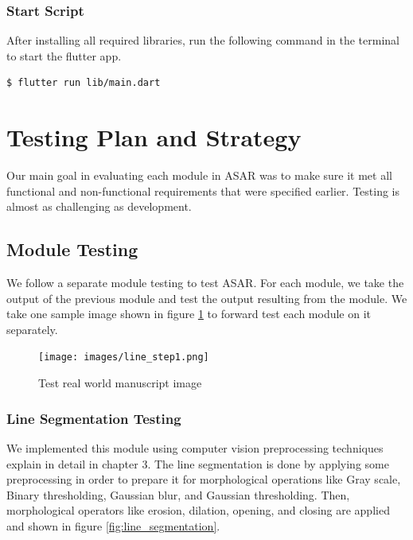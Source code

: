 \subsubsection{Start Script}
After installing all required libraries, run the following command in the terminal to start the flutter app.

\begin{verbatim}
$ flutter run lib/main.dart
\end{verbatim}

\section{Testing Plan and Strategy}
Our main goal in evaluating each module in ASAR was to make sure it met all functional and non-functional requirements that were specified earlier. Testing is almost as challenging as development.

\subsection{Module Testing}
We follow a separate module testing to test ASAR. For each module, we take the output of the previous module and test the output resulting from the module. We take one sample image shown in figure \ref{fig:real-world-sample} to forward test each module on it separately.

\begin{figure}[H]
    \centering
    \texttt{[image: images/line\_step1.png]}
    \caption{Test real world manuscript image}
    \label{fig:real-world-sample}
\end{figure}

\subsubsection{Line Segmentation Testing}

We implemented this module using computer vision preprocessing techniques explain in detail in chapter 3. The line segmentation is done by applying some preprocessing in order to prepare it for morphological operations like Gray scale, Binary thresholding, Gaussian blur, and Gaussian thresholding. Then, morphological operators like erosion, dilation, opening, and closing are applied and shown in figure \ref{fig:line_segmentation}.

